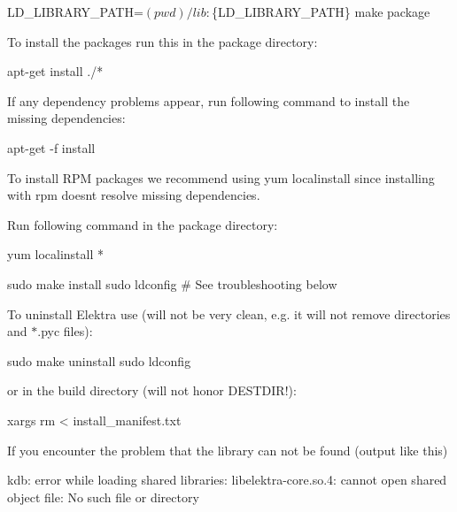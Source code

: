 \begin{DoxyCode}
LD\_LIBRARY\_PATH=$(pwd)/lib:$\{LD\_LIBRARY\_PATH\} make package
\end{DoxyCode}


To install the packages run this in the {\ttfamily package} directory\+:


\begin{DoxyCode}
apt-get install ./*
\end{DoxyCode}


If any dependency problems appear, run following command to install the missing dependencies\+:


\begin{DoxyCode}
apt-get -f install
\end{DoxyCode}


To install R\+PM packages we recommend using {\ttfamily yum localinstall} since installing with {\ttfamily rpm} doesn\textquotesingle{}t resolve missing dependencies.

Run following command in the {\ttfamily package} directory\+:


\begin{DoxyCode}
yum localinstall *
\end{DoxyCode}



\begin{DoxyCode}
sudo make install
sudo ldconfig  # See troubleshooting below
\end{DoxyCode}


To uninstall Elektra use (will not be very clean, e.\+g. it will not remove directories and {\ttfamily $\ast$.pyc} files)\+:


\begin{DoxyCode}
sudo make uninstall
sudo ldconfig
\end{DoxyCode}


or in the build directory (will not honor {\ttfamily D\+E\+S\+T\+D\+IR}!)\+:


\begin{DoxyCode}
xargs rm < install\_manifest.txt
\end{DoxyCode}


If you encounter the problem that the library can not be found (output like this)


\begin{DoxyCode}
kdb: error while loading shared libraries:
     libelektra-core.so.4: cannot open shared object file: No such file or directory
\end{DoxyCode}


